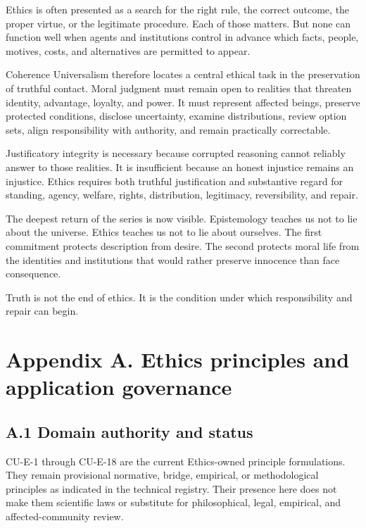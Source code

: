 \documentclass[
  11pt,
]{article}
\begin{document}
Ethics is often presented as a search for the right rule, the correct
outcome, the proper virtue, or the legitimate procedure. Each of those
matters. But none can function well when agents and institutions control
in advance which facts, people, motives, costs, and alternatives are
permitted to appear.

Coherence Universalism therefore locates a central ethical task in the
preservation of truthful contact. Moral judgment must remain open to
realities that threaten identity, advantage, loyalty, and power. It must
represent affected beings, preserve protected conditions, disclose
uncertainty, examine distributions, review option sets, align
responsibility with authority, and remain practically correctable.

Justificatory integrity is necessary because corrupted reasoning cannot
reliably answer to those realities. It is insufficient because an honest
injustice remains an injustice. Ethics requires both truthful
justification and substantive regard for standing, agency, welfare,
rights, distribution, legitimacy, reversibility, and repair.

The deepest return of the series is now visible. Epistemology teaches us
not to lie about the universe. Ethics teaches us not to lie about
ourselves. The first commitment protects description from desire. The
second protects moral life from the identities and institutions that
would rather preserve innocence than face consequence.

Truth is not the end of ethics. It is the condition under which
responsibility and repair can begin.

\section{Appendix A. Ethics principles and application
governance}\label{appendix-a.-ethics-principles-and-application-governance}

\subsection{A.1 Domain authority and
status}\label{a.1-domain-authority-and-status}

CU-E-1 through CU-E-18 are the current Ethics-owned principle
formulations. They remain provisional normative, bridge, empirical, or
methodological principles as indicated in the technical registry. Their
presence here does not make them scientific laws or substitute for
philosophical, legal, empirical, and affected-community review.
\end{document}
